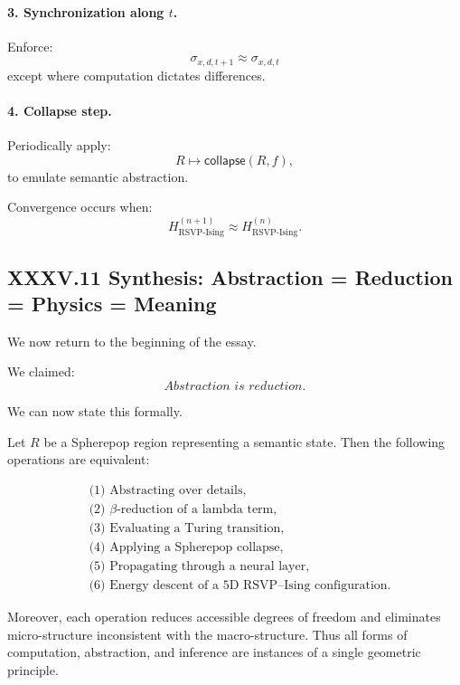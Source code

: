 \documentclass[11pt,letterpaper]{article}
\begin{document}
\paragraph{3. Synchronization along $t$.}
Enforce:
\[
\sigma_{x,d,t+1} \approx \sigma_{x,d,t}
\]
except where computation dictates differences.

\paragraph{4. Collapse step.}
Periodically apply:
\[
R \mapsto \mathsf{collapse}(R,f),
\]
to emulate semantic abstraction.

Convergence occurs when:
\[
H_{\text{RSVP-Ising}}^{(n+1)} \approx H_{\text{RSVP-Ising}}^{(n)}.
\]

\subsection{XXXV.11 Synthesis: Abstraction = Reduction = Physics = Meaning}

We now return to the beginning of the essay.

We claimed:
\[
\textit{Abstraction is reduction.}
\]

We can now state this formally.

\begin{theorem}
Let $R$ be a Spherepop region representing a semantic state.
Then the following operations are equivalent:

\[
\begin{aligned}
&\text{(1) Abstracting over details},\\
&\text{(2) $\beta$-reduction of a lambda term},\\
&\text{(3) Evaluating a Turing transition},\\
&\text{(4) Applying a Spherepop collapse},\\
&\text{(5) Propagating through a neural layer},\\
&\text{(6) Energy descent of a 5D RSVP--Ising configuration}.
\end{aligned}
\]

Moreover, each operation reduces accessible degrees of freedom 
and eliminates micro-structure inconsistent with the macro-structure.
Thus all forms of computation, abstraction, and inference
are instances of a single geometric principle.
\end{theorem}
\end{document}
